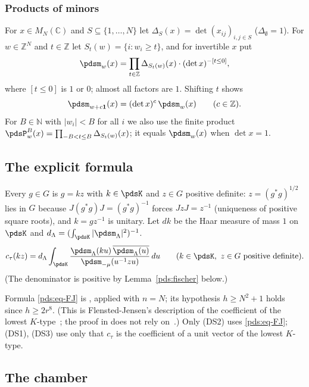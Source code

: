 \documentclass[10pt]{amsart}
\theoremstyle{definition}
\theoremstyle{remark}
\newcommand{\C}{\mathbb C}
\newcommand{\N}{\mathbb N}
\newcommand{\Z}{\mathbb Z}
\providecommand{\aubar}[1]{\overline{#1}}
\begin{document}
\subsubsection*{Products of minors}
For $x\in M_N(\C)$ and $S\subseteq\{1,\dots,N\}$ let $\Delta_S(x)=\det(x_{ij})_{i,j\in S}$
($\Delta_\emptyset=1$). For $w\in\Z^N$ and $t\in\Z$ let $S_t(w)=\{i:w_i\ge t\}$, and for invertible
$x$ put
\begin{equation}\label{pds:eq-m}
\pdsm_w(x)=\prod_{t\in\Z}\Delta_{S_t(w)}(x)\cdot(\det x)^{-[t\le0]},
\end{equation}
where $[t\le 0]$ is $1$ or $0$; almost all factors are $1$. Shifting $t$ shows
\begin{equation}\label{pds:eq-shift}
\pdsm_{w+c\mathbf 1}(x)=(\det x)^c\,\pdsm_w(x)\qquad(c\in\Z).
\end{equation}
For $B\in\N$ with $|w_i|<B$ for all $i$ we also use the finite product $\pdsP^B_w(x)=\prod_{-B<t\le B}
\Delta_{S_t(w)}(x)$; it equals $\pdsm_w(x)$ when $\det x=1$.

\subsection{The explicit formula}\label{pds:ss-FJ}

Every $g\in G$ is $g=kz$ with $k\in\pdsK$ and $z\in G$ positive definite: $z=(g^*g)^{1/2}$ lies in
$G$ because $J(g^*g)J=(g^*g)^{-1}$ forces $JzJ=z^{-1}$ (uniqueness of positive square roots), and
$k=gz^{-1}$ is unitary. Let $dk$ be the Haar measure of mass $1$ on $\pdsK$ and
$d_\Lambda=(\int_{\pdsK}|\pdsm_\Lambda|^2)^{-1}$.
\begin{equation}\label{pds:eq-FJ}
c_\tau(kz)=d_\Lambda\int_{\pdsK}\frac{\pdsm_\Lambda(ku)\,\aubar{\pdsm_\Lambda(u)}}{\pdsm_{-\mu}(u^{-1}zu)}
\,du\qquad(k\in\pdsK,\ z\in G\text{ positive definite}).
\end{equation}
(The denominator is positive by Lemma~\ref{pds:fischer} below.)

Formula \eqref{pds:eq-FJ} is {\cite[Theorem~3.17]{P49}}, applied with $n=N$; its hypothesis $h\ge N^2+1$
holds since $h\ge2r^8$. (This is Flensted-Jensen's description of the coefficient of the lowest
$K$-type~\cite{FJ}; the proof in {\cite[\S3.2]{P49}} does not rely on~\cite{FJ}.) Only \textup{(DS2)} uses
\eqref{pds:eq-FJ}; \textup{(DS1)}, \textup{(DS3)} use only that $c_\tau$ is the coefficient of a unit
vector of the lowest $K$-type.

\subsection{The chamber}\label{pds:ss-chamber}
\end{document}
